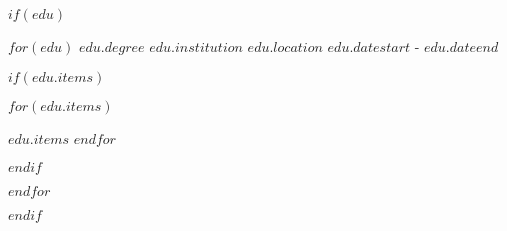 \documentclass[18pt, letterpaper]{awesome-cv}
\begin{document}
$if(edu)$
\begin{cventries}

$for(edu)$
\cventry
{$edu.degree$}
{$edu.institution$}
{$edu.location$}
{$edu.datestart$ - $edu.dateend$}
{
$if(edu.items)$
\begin{cvitems}
$for(edu.items)$
    \item{$edu.items$}
$endfor$
\end{cvitems}
$endif$
}
\vspace{6mm}
$endfor$
\end{cventries}
$endif$
\end{document}
